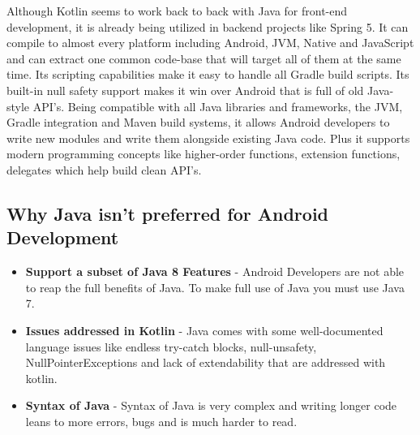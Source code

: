 Although Kotlin seems to work back to back with Java for front-end development, it is already being utilized in backend projects like Spring 5. It can compile to almost every platform including Android, JVM, Native and JavaScript and can extract one common code-base that will target all of them at the same time. Its scripting capabilities make it easy to handle all Gradle build scripts. Its built-in null safety support makes it win over Android that is full of old Java-style API’s. Being compatible with all Java libraries and frameworks, the JVM, Gradle integration and Maven build systems, it allows Android developers to write new modules and write them alongside existing Java code. Plus it supports modern programming concepts like higher-order functions, extension functions, delegates which help build clean API’s.
\newpage

\subsection{Why Java isn't preferred for Android Development}
\begin{itemize}
    \item \textbf{Support a subset of Java 8 Features} - Android Developers are not able to reap the full benefits of Java. To make full use of Java you must use Java 7. \cite{android_sup_java}
    \item \textbf{Issues addressed in Kotlin} - Java comes with some well-documented language issues like endless try-catch blocks, null-unsafety, NullPointerExceptions and lack of extendability that are addressed with kotlin.
    \item \textbf{Syntax of Java} - Syntax of Java is very complex and writing longer code leans to more errors, bugs and is much harder to read.
\end{itemize}

